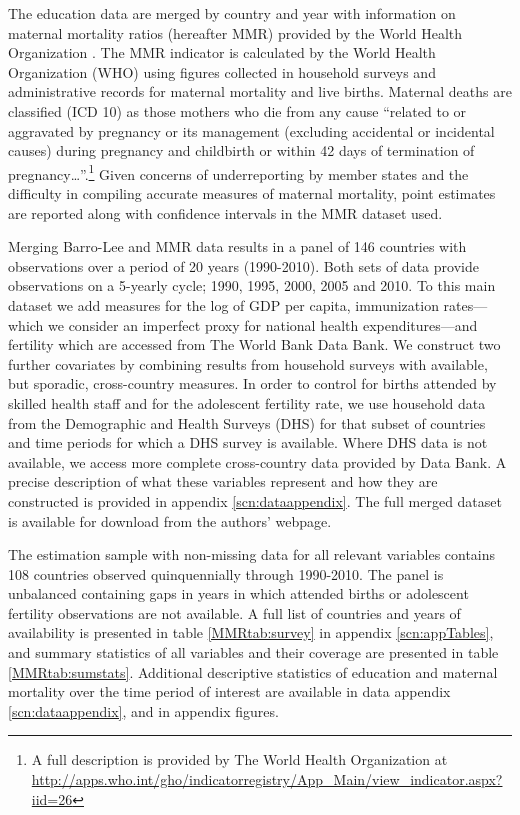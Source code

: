 \documentclass{article}[12pt,subeqn]
\begin{document}
\begin{spacing}{1.4}
The education data are merged by country and year with information on maternal 
mortality ratios (hereafter MMR) provided by the World Health Organization 
\citep{WHO2012}. The MMR indicator is calculated by the World Health 
Organization (WHO) using figures collected in household surveys and 
administrative records for maternal mortality and live births. Maternal 
deaths are classified (ICD 10) as those mothers who die from any cause ``related 
to or aggravated by pregnancy or its management (excluding accidental or 
incidental causes) during pregnancy and childbirth or within 42 days of 
termination of pregnancy\ldots''.\footnote{A full description is provided by 
The World Health Organization at 
\url{http://apps.who.int/gho/indicatorregistry/App_Main/view_indicator.aspx?iid=26}} 
Given concerns of underreporting by member states and the difficulty in compiling 
accurate measures of maternal mortality, point estimates are reported along with 
confidence intervals in the MMR dataset used.

Merging Barro-Lee and MMR data results in a panel of 146 countries with 
observations over a period of 20 years (1990-2010). Both sets of data provide 
observations on a 5-yearly cycle; 1990, 1995, 2000, 2005 and 2010. To this main 
dataset we add measures for the log of GDP per capita, immunization rates---which 
we consider an imperfect proxy for national health expenditures---and fertility 
which are accessed from The World Bank Data Bank. We construct two further 
covariates by combining results from household surveys with available, but
sporadic, cross-country measures. In order to control for births attended by skilled
health staff and for the adolescent fertility rate, we use household data from the
Demographic and Health Surveys (DHS) for that subset of countries and time periods for
which a DHS survey is available. Where DHS data is not available, we access more
complete cross-country data provided by \citet{WorldBank2012} Data Bank. A precise
description of what these variables represent and how they are constructed is
provided in appendix \ref{scn:dataappendix}.  The full merged dataset is available
for download from the authors' webpage.

The estimation sample with non-missing data for all relevant variables contains 
108 countries observed quinquennially through 1990-2010. The panel is unbalanced 
containing gaps in years in which attended births or adolescent fertility 
observations are not available. A full list of countries and years of 
availability is presented in table \ref{MMRtab:survey} in appendix 
\ref{scn:appTables}, and summary statistics of all variables and their coverage
are presented in table \ref{MMRtab:sumstats}.  Additional descriptive statistics
of education and maternal mortality over the time period of interest are available
in data appendix \ref{scn:dataappendix}, and in appendix figures.


\end{spacing}
\end{document}
